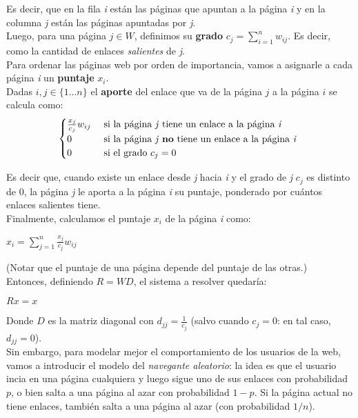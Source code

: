 Es decir, que en la fila \textit{i} están las páginas que apuntan a la página \textit{i} y en la columna \textit{j} están las páginas apuntadas por \textit{j}. \\

Luego, para una página $j \in W$, definimos su \textbf{grado} $c_{j} = \sum_{i = 1}^{n} w_{ij}$. Es decir, como la cantidad de enlaces \textit{salientes} de \textit{j}. \\

Para ordenar las páginas web por orden de importancia, vamos a asignarle a cada página \textit{i} un \textbf{puntaje} $x_i$. \\

Dadas $i, j \in \{1...n\}$ el \textbf{aporte} del enlace que va de la página $j$ a la página $i$ se calcula como: \\

\[
	\begin{cases}
		\frac{x_j}{c_j}w_{ij} 	& \text{ si la página \textit{j} tiene un enlace a la página \textit{i} } \\
		0 			& \text{ si la página \textit{j} \textbf{no} tiene un enlace a la página \textit{i} } \\
		0 			& \text{ si el grado $c_j = 0$}
	\end{cases}
\]

Es decir que, cuando existe un enlace desde \textit{j} hacia \textit{i} y el grado de \textit{j} $c_j$ es distinto de $0$, la página \textit{j} le aporta a la página \textit{i} su puntaje, ponderado por cuántos enlaces salientes tiene. \\

Finalmente, calculamos el puntaje $x_i$ de la página \textit{i} como:

$ x_i = \sum_{j=1}^{n} \frac{x_j}{c_j} w_{ij} $

(Notar que el puntaje de una página depende del puntaje de las otras.) \\

Entonces, definiendo $R = WD$, el sistema a resolver quedaría:

$Rx = x$

Donde $D$ es la matriz diagonal con $d_{jj} = \frac{1}{c_j}$ (salvo cuando $c_j = 0$: en tal caso, $d_{jj} = 0$). \\

Sin embargo, para modelar mejor el comportamiento de los usuarios de la web, vamos a introducir el modelo del \textit{navegante aleatorio}: la idea es que el usuario incia en una página cualquiera y luego sigue uno de sus enlaces con probabilidad $p$, o bien salta a una página al azar con probabilidad $1 - p$. Si la página actual no tiene enlaces, también salta a una página al azar (con probabilidad $1/n$). \\

